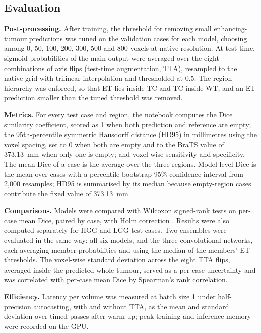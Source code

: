 \documentclass[final,3p,times,number]{elsarticle}
\begin{document}
\subsection{Evaluation}

\textbf{Post-processing.} After training, the threshold for removing small enhancing-tumour predictions was tuned on the validation cases for each model, choosing among 0, 50, 100, 200, 300, 500 and 800 voxels at native resolution. At test time, sigmoid probabilities of the main output were averaged over the eight combinations of axis flips (test-time augmentation, TTA), resampled to the native grid with trilinear interpolation and thresholded at 0.5. The region hierarchy was enforced, so that ET lies inside TC and TC inside WT, and an ET prediction smaller than the tuned threshold was removed.

\textbf{Metrics.} For every test case and region, the notebook computes the Dice similarity coefficient, scored as 1 when both prediction and reference are empty; the 95th-percentile symmetric Hausdorff distance (HD95) in millimetres using the voxel spacing, set to 0 when both are empty and to the BraTS value of 373.13~mm when only one is empty; and voxel-wise sensitivity and specificity. The mean Dice of a case is the average over the three regions. Model-level Dice is the mean over cases with a percentile bootstrap 95\% confidence interval from 2,000 resamples; HD95 is summarised by its median because empty-region cases contribute the fixed value of 373.13~mm.

\textbf{Comparisons.} Models were compared with Wilcoxon signed-rank tests on per-case mean Dice, paired by case, with Holm correction \cite{ref16}. Results were also computed separately for HGG and LGG test cases. Two ensembles were evaluated in the same way: all six models, and the three convolutional networks, each averaging member probabilities and using the median of the members' ET thresholds. The voxel-wise standard deviation across the eight TTA flips, averaged inside the predicted whole tumour, served as a per-case uncertainty and was correlated with per-case mean Dice by Spearman's rank correlation.

\textbf{Efficiency.} Latency per volume was measured at batch size 1 under half-precision autocasting, with and without TTA, as the mean and standard deviation over timed passes after warm-up; peak training and inference memory were recorded on the GPU.
\end{document}
